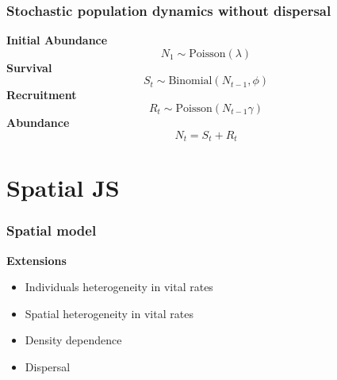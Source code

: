 \documentclass[color=usenames,dvipsnames]{beamer}
\begin{document}
\begin{frame}
  \frametitle{Stochastic population dynamics without dispersal}
  {\bf Initial Abundance}
  \[
    N_1 \sim \mbox{Poisson}(\lambda)
  \]
  \vfill
  {\bf Survival}
  \[
    S_t \sim \mbox{Binomial}(N_{t-1}, \phi)
  \]
  \vfill
  {\bf Recruitment}
  \[
    R_t \sim \mbox{Poisson}(N_{t-1} \gamma)
  \]
  \vfill
  {\bf Abundance}
  \[
    N_t = S_t + R_t
  \]
\end{frame}



















\section{Spatial JS}






\begin{frame}
  \frametitle{Spatial model}
  \large
  {\bf Extensions}
  \begin{itemize}
    \item Individuals heterogeneity in vital rates
    \item Spatial heterogeneity in vital rates
    \item Density dependence
    \item Dispersal
  \end{itemize}
\end{frame}
\end{document}
